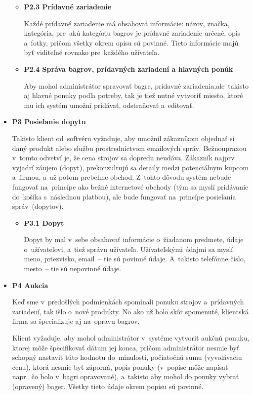 \begin{itemize}
\begin{itemize}
\item \textbf{P2.3 Prídavné zariadenie}

Každé prídavné zariadenie má obsahovať informácie: názov, značka, kategória, pre~akú kategóriu bagrov je prídavné zariadenie určené, opis a~fotky, pričom všetky okrem opisu sú povinné. Tieto informácie majú byť viditeľné rovnako pre~každého užívateľa.

\item \textbf{P2.4 Správa bagrov, prídavných zariadení a hlavných ponúk}

Aby mohol administrátor spravovať bagre, prídavné zariadenia,\linebreak ale~takisto aj hlavné ponuky podľa potreby, tak je tiež nutné vytvoriť miesto, ktoré mu ich systém umožní pridávať, odstraňovať a~editovať.
\end{itemize}

\item \textbf{P3 Posielanie dopytu}

Takisto klient od~softvéru vyžaduje, aby umožnil zákazníkom objednať si daný produkt alebo službu prostredníctvom emailových správ. Bežnou\linebreak praxou v~tomto odvetví je, že cena strojov sa dopredu neudáva. Zákazník najprv vyjadrí záujem (dopyt), prekonzultujú sa detaily medzi potenciálnym kupcom a~firmou, a~až potom prebehne obchod. Z~tohto dôvodu systém nebude fungovať na~princípe ako bežné internetové obchody (tým sa myslí pridávanie do~košíka s~následnou platbou), ale bude fungovať na~princípe posielania správ~(dopytov).

\begin{itemize}
\item \textbf{P3.1 Dopyt}

Dopyt by mal v~sebe obsahovať informácie o~žiadanom predmete, údaje o~užívateľovi, a~tiež správu užívateľa. Užívateľskými údajmi sa myslí meno, priezvisko, email~-- tie sú povinné údaje. A~takisto telefónne číslo, mesto~-- tie sú nepovinné údaje.
\end{itemize}
\newpage
\item \textbf{P4 Aukcia}

Keď sme v~predošlých podmienkách spomínali ponuku strojov a~prídavných zariadení, tak išlo o~nové produkty. No ako už bolo skôr spomenuté, klientská firma sa špecializuje aj na~opravu bagrov.

Klient vyžaduje, aby mohol administrátor v~systéme vytvoriť aukčnú ponuku, ktorej môže špecifikovať dátum jej konca, pričom administrátor nesmie byť schopný nastaviť túto hodnotu do~minulosti, počiatočnú sumu (vyvolávaciu cenu), ktorá nesmie byť záporná, popis ponuky (v~popise môže napísať napr.~čo bolo v~bagri opravované), a~takisto aby mohol do ponuky vybrať (opravený) bager. Všetky tieto údaje okrem popisu sú povinné.


\end{itemize}
